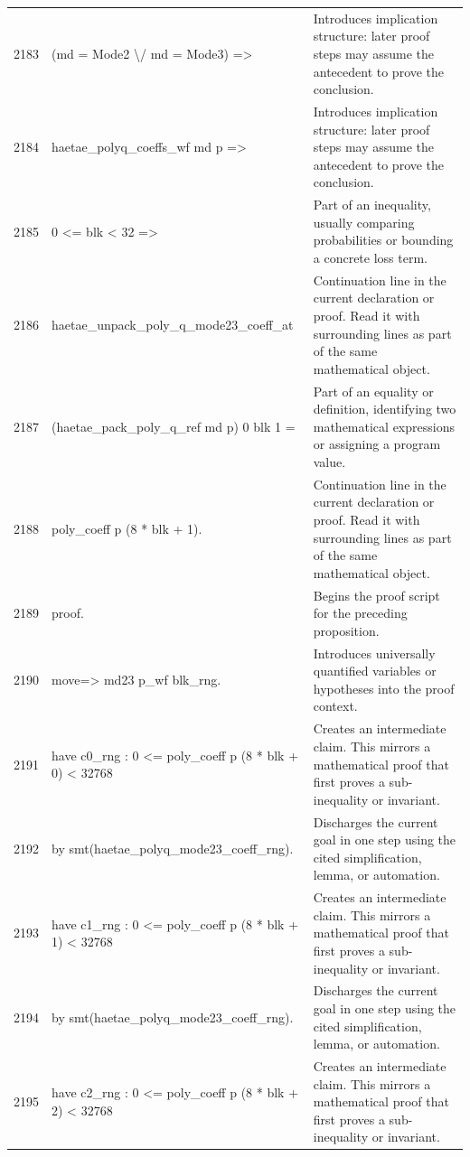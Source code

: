 \documentclass[10pt]{article}
\begin{document}
\begin{longtable}{r L{0.53\textwidth} L{0.37\textwidth}}
2183 & {\ttfamily\scriptsize   (md = Mode2 \textbackslash{}/ md = Mode3) =>} & Introduces implication structure: later proof steps may assume the antecedent to prove the conclusion. \\
2184 & {\ttfamily\scriptsize   haetae\_polyq\_coeffs\_wf md p =>} & Introduces implication structure: later proof steps may assume the antecedent to prove the conclusion. \\
2185 & {\ttfamily\scriptsize   0 <= blk < 32 =>} & Part of an inequality, usually comparing probabilities or bounding a concrete loss term. \\
2186 & {\ttfamily\scriptsize   haetae\_unpack\_poly\_q\_mode23\_coeff\_at} & Continuation line in the current declaration or proof.  Read it with surrounding lines as part of the same mathematical object. \\
2187 & {\ttfamily\scriptsize     (haetae\_pack\_poly\_q\_ref md p) 0 blk 1 =} & Part of an equality or definition, identifying two mathematical expressions or assigning a program value. \\
2188 & {\ttfamily\scriptsize   poly\_coeff p (8 * blk + 1).} & Continuation line in the current declaration or proof.  Read it with surrounding lines as part of the same mathematical object. \\
2189 & {\ttfamily\scriptsize proof.} & Begins the proof script for the preceding proposition. \\
2190 & {\ttfamily\scriptsize move=> md23 p\_wf blk\_rng.} & Introduces universally quantified variables or hypotheses into the proof context. \\
2191 & {\ttfamily\scriptsize have c0\_rng : 0 <= poly\_coeff p (8 * blk + 0) < 32768} & Creates an intermediate claim.  This mirrors a mathematical proof that first proves a sub-inequality or invariant. \\
2192 & {\ttfamily\scriptsize   by smt(haetae\_polyq\_mode23\_coeff\_rng).} & Discharges the current goal in one step using the cited simplification, lemma, or automation. \\
2193 & {\ttfamily\scriptsize have c1\_rng : 0 <= poly\_coeff p (8 * blk + 1) < 32768} & Creates an intermediate claim.  This mirrors a mathematical proof that first proves a sub-inequality or invariant. \\
2194 & {\ttfamily\scriptsize   by smt(haetae\_polyq\_mode23\_coeff\_rng).} & Discharges the current goal in one step using the cited simplification, lemma, or automation. \\
2195 & {\ttfamily\scriptsize have c2\_rng : 0 <= poly\_coeff p (8 * blk + 2) < 32768} & Creates an intermediate claim.  This mirrors a mathematical proof that first proves a sub-inequality or invariant. \\

\end{longtable}
\end{document}
